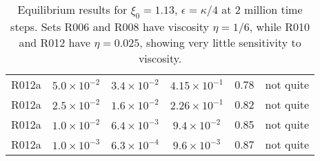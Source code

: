 \begin{table}
\begin{center}
\begin{tabular}{|c|c|c|c|c|c|}
R012a & $5.0\times 10^{-2}$ & $3.4\times 10^{-2}$ & $4.15\times10^{-1}$
      & 0.78 &  not quite\\
R012a & $2.5\times 10^{-2}$ & $1.6\times 10^{-2}$ & $2.26\times10^{-1}$
      & 0.82 &  not quite\\
R012a & $1.0\times 10^{-2}$ & $6.4\times 10^{-3}$ & $9.4\times10^{-2}$
      & 0.85 & not quite \\
R012a & $1.0\times 10^{-3}$ & $6.3\times 10^{-4}$ & $9.6\times10^{-3}$
      & 0.87 &  not quite\\
\hline
\end{tabular}
\label{table:xi113}
\caption{Equilibrium results for $\xi_0 = 1.13$, $\epsilon = \kappa/4$
at 2 million time steps.
Sets R006 and R008 have viscosity $\eta = 1/6$, while R010 and R012
have $\eta = 0.025$, showing very little sensitivity to viscosity.}
\end{center}
\end{table}


